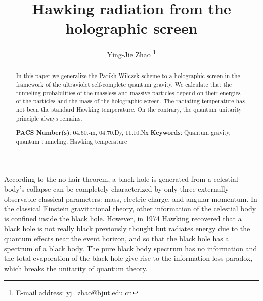 \documentclass[12pt]{article}
\begin{document}
\renewcommand{\thefootnote}{\fnsymbol{footnote}}
%
\title{Hawking radiation from the holographic screen}
%
\author[1]{\small Ying-Jie Zhao \thanks{E-mail address: yj\_zhao@bjut.edu.cn}}

%


%
\date{}
\maketitle
\begin{abstract}

\setlength{\parindent}{0pt} \setlength{\parskip}{1.5ex plus 0.5ex
minus 0.2ex} %
In this paper we generalize the Parikh-Wilczek scheme to a holographic screen in the framework of the ultraviolet self-complete
quantum gravity. We calculate that the tunneling probabilities of the massless and massive
particles depend on their energies of the particles and the mass of the holographic screen. The radiating temperature has not been the standard Hawking temperature.
On the contrary, the quantum unitarity principle always remains.

\vskip 10pt
\noindent
{\bf PACS Number(s)}: 04.60.-m, 04.70.Dy, 11.10.Nx
\vskip 5pt
\noindent
{\bf Keywords}: Quantum gravity, quantum tunneling, Hawking temperature

\end{abstract}

\thispagestyle{empty}

\newpage

\setcounter{page}{1}



According to the no-hair theorem, a black hole is generated from a celestial body's collapse can be completely characterized by only three externally observable classical parameters: mass, electric charge, and angular momentum.  In the classical Einstein gravitational theory, other information of the celestial body  is confined inside the black hole. However,
in 1974 Hawking\cite{HAWKING1,HAWKING2} recovered that a black hole is not really black previously thought but radiates energy due to the quantum effects near the event horizon, and so that the black hole has a spectrum of a black body. The pure black body spectrum  has no information and the total evaporation of the black hole give rise to the information loss paradox, which breaks the
unitarity of quantum theory.
\end{document}

